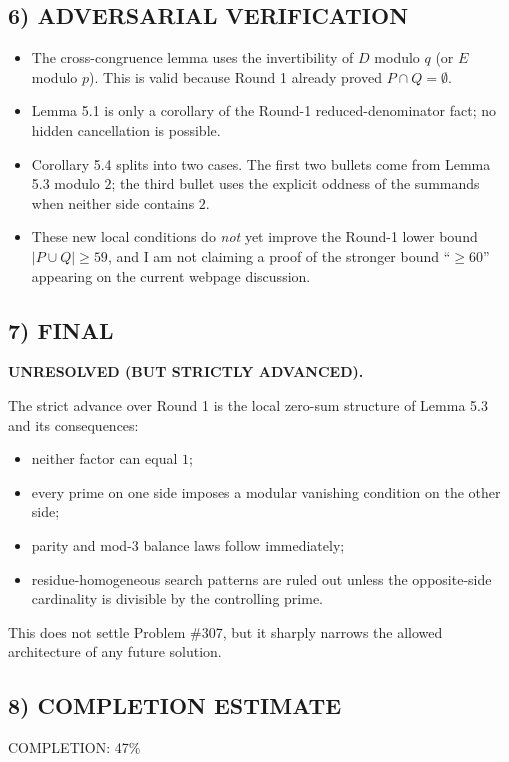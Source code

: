 \subsection*{6) ADVERSARIAL VERIFICATION}
\begin{itemize}
\item The cross-congruence lemma uses the invertibility of $D$ modulo $q$ (or $E$ modulo $p$). This is valid because Round 1 already proved $P\cap Q=\emptyset$.
\item Lemma 5.1 is only a corollary of the Round-1 reduced-denominator fact; no hidden cancellation is possible.
\item Corollary 5.4 splits into two cases. The first two bullets come from Lemma 5.3 modulo $2$; the third bullet uses the explicit oddness of the summands when neither side contains $2$.
\item These new local conditions do \emph{not} yet improve the Round-1 lower bound $|P\cup Q|\ge 59$, and I am not claiming a proof of the stronger bound ``$\ge 60$'' appearing on the current webpage discussion.
\end{itemize}

\subsection*{7) FINAL}
\textbf{UNRESOLVED (BUT STRICTLY ADVANCED).}

The strict advance over Round 1 is the local zero-sum structure of Lemma 5.3 and its consequences:

\begin{itemize}
\item neither factor can equal $1$;
\item every prime on one side imposes a modular vanishing condition on the other side;
\item parity and mod-$3$ balance laws follow immediately;
\item residue-homogeneous search patterns are ruled out unless the opposite-side cardinality is divisible by the controlling prime.
\end{itemize}

This does not settle Problem \#307, but it sharply narrows the allowed architecture of any future solution.

\subsection*{8) COMPLETION ESTIMATE}
COMPLETION: 47\%

